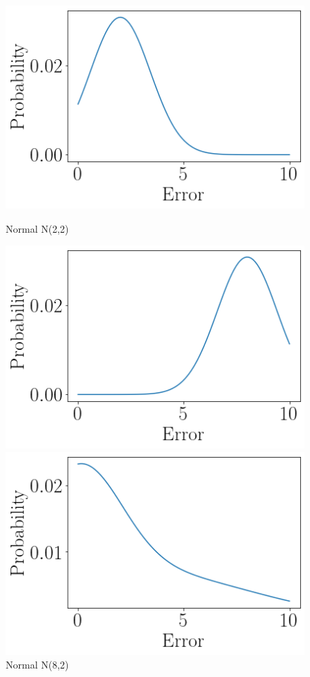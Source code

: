 \begin{figure}[ht]
\begin{minipage}[b]{0.5\linewidth}
    \includegraphics[width=\linewidth]{./img/distributions/normal_n_2_2.png}
    \caption{Normal N(2,2)}
    \vspace{4ex}
    \label{n_2_2_hist}
  \end{minipage}%
  \begin{minipage}[b]{0.5\linewidth}
    \centering
    \includegraphics[width=\linewidth]{./img/distributions/normal_n_8_2.png}
    \caption{Normal N(8,2)}
    \vspace{4ex}
  \end{minipage}
  \begin{minipage}[b]{0.5\linewidth}
    \centering
    \includegraphics[width=\linewidth]{./img/distributions/heavy_tailed_2.png}

\end{minipage}
\end{figure}

